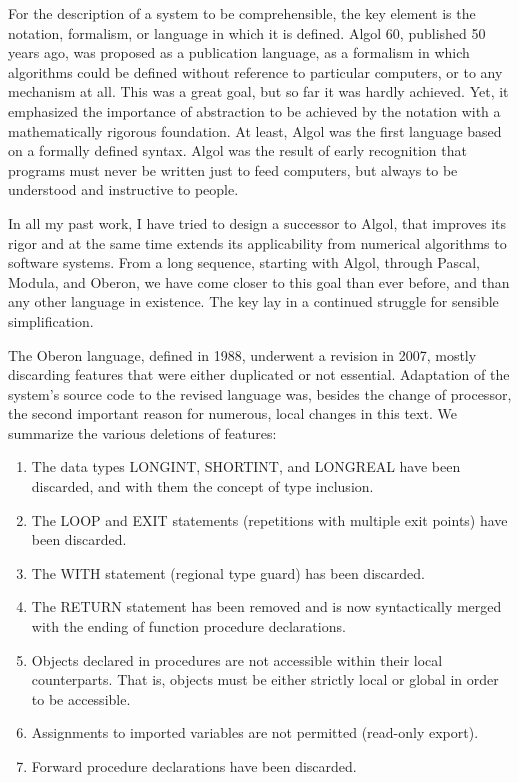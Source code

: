 For the description of a system to be comprehensible, the key element is the notation, formalism, or
language in which it is defined. Algol 60, published 50 years ago, was proposed as a publication
language, as a formalism in which algorithms could be defined without reference to particular
computers, or to any mechanism at all. This was a great goal, but so far it was hardly achieved.
Yet, it emphasized the importance of abstraction to be achieved by the notation with a mathematically
rigorous foundation. At least, Algol was the first language based on a formally defined syntax. Algol
was the result of early recognition that programs must never be written just to feed computers,
but always to be understood and instructive to people.

In all my past work, I have tried to design a successor to Algol, that improves its rigor and at the
same time extends its applicability from numerical algorithms to software systems. From a long
sequence, starting with Algol, through Pascal, Modula, and Oberon, we have come closer to this
goal than ever before, and than any other language in existence. The key lay in a continued
struggle for sensible simplification.

The Oberon language, defined in 1988, underwent a revision in 2007, mostly discarding features
that were either duplicated or not essential. Adaptation of the system's source code to the revised
language was, besides the change of processor, the second important reason for numerous, local
changes in this text. We summarize the various deletions of features:
\begin{enumerate}
  \item The data types LONGINT, SHORTINT, and LONGREAL have been discarded, and with them the concept of type inclusion.
  \item The LOOP and EXIT statements (repetitions with multiple exit points) have been discarded.
  \item The WITH statement (regional type guard) has been discarded.
  \item The RETURN statement has been removed and is now syntactically merged with the ending of function procedure declarations.
  \item Objects declared in procedures are not accessible within their local counterparts. That is, objects must be either strictly local or global in order to be accessible.
  \item Assignments to imported variables are not permitted (read-only export).
  \item Forward procedure declarations have been discarded.
\end{enumerate}

